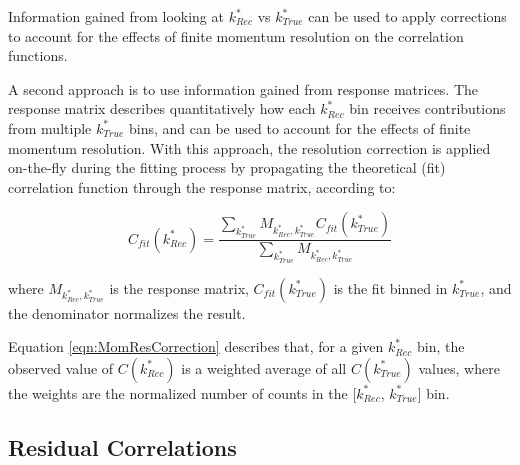 \documentclass[ALICE,manyauthors]{cernphprep}
\begin{document}
Information gained from looking at $k^{*}_{Rec}$ vs $k^{*}_{True}$ can be used to apply corrections to account for the effects of finite momentum resolution on the correlation functions.



A second approach is to use information gained from response matrices.
The response matrix describes quantitatively how each $k^{*}_{Rec}$ bin receives contributions from multiple $k^{*}_{True}$ bins, and can be used to account for the effects of finite momentum resolution.
With this approach, the resolution correction is applied on-the-fly during the fitting process by propagating the theoretical (fit) correlation function through the response matrix, according to:  

\begin{equation}
  C_{fit}(k^{*}_{Rec}) = \dfrac{\sum\limits_{k^{*}_{True}}M_{k^{*}_{Rec},k^{*}_{True}}C_{fit}(k^{*}_{True})}{\sum\limits_{k^{*}_{True}}M_{k^{*}_{Rec},k^{*}_{True}}}
\label{eqn:MomResCorrection}
\end{equation}

where $M_{k^{*}_{Rec},k^{*}_{True}}$ is the response matrix, $C_{fit}(k^{*}_{True})$ is the fit binned in $k^{*}_{True}$, and the denominator normalizes the result.

Equation \ref{eqn:MomResCorrection} describes that, for a given $k^{*}_{Rec}$ bin, the observed value of $C(k^{*}_{Rec})$ is a weighted average of all $C(k^{*}_{True})$ values, where the weights are the normalized number of counts in the [$k^{*}_{Rec}$, $k^{*}_{True}$] bin.




\subsection{Residual Correlations}
\label{ResidualCorrelations}
\end{document}
